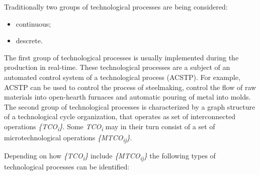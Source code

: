 \documentclass{article}
\begin{document}
\begin{minipage}[t]{0.45\textwidth}
    \hspace{0.2cm} Traditionally two groups of technological processes are being considered:
\begin{itemize}[noitemsep,topsep=2pt]
\item continuous;
\item descrete.
\end{itemize}
    \vspace{0.1\baselineskip} \hspace{0.2cm} The first group of technological processes is usually implemented during the production in real-time. These technological processes are a subject of an automated control system of a technological process (ACSTP). For example, ACSTP can be used to control the process of steelmaking, control the flow of raw materials into open-hearth furnaces and automatic pouring of metal into molds. The second group of technological processes is characterized by a graph structure of a technological cycle organization, that operates as set of interconnected operations \textit{\{TCO\textsubscript{i}\}}. Some \textit{TCO\textsubscript{i}} may in their turn consist of a set of microtechnological operations \textit{\{MTCO\textsubscript{ij}\}}.

    \hspace{0.2cm} Depending on how \textit{\{TCO\textsubscript{i}\}} include \textit{\{MTCO\textsubscript{ij}\}} the following types of technological processes can be identified:

\end{minipage}
\hspace{0.2cm} 
\end{document}
